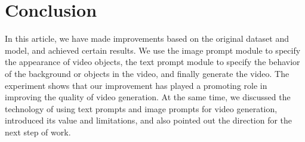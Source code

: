 \section{Conclusion}
In this article, we have made improvements based on the original dataset and model, and achieved certain results. We use the image prompt module to specify the appearance of video objects, the text prompt module to specify the behavior of the background or objects in the video, and finally generate the video. The experiment shows that our improvement has played a promoting role in improving the quality of video generation. At the same time, we discussed the technology of using text prompts and image prompts for video generation, introduced its value and limitations, and also pointed out the direction for the next step of work.